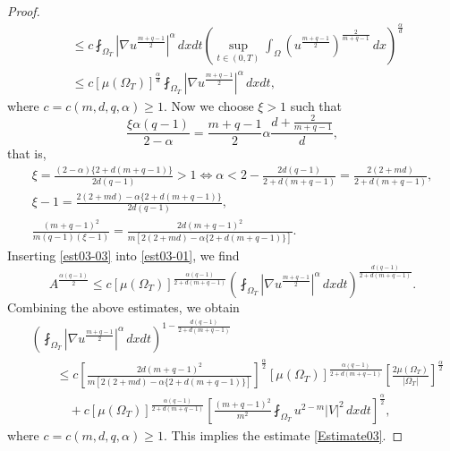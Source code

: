 \documentclass{amsart}
\numberwithin{equation}{section}
\begin{document}
\begin{proof}
\begin{equation}
\begin{aligned}
  &\le c \fint_{\Omega_T} \left|\nabla u^{\frac{m+q-1}{2}}\right|^{\alpha} \,dxdt \left(\sup_{t \in (0, T)} \int_{\Omega} \left(u^{\frac{m+q-1}{2}}\right)^{\frac{2}{m+q-1}} \,dx \right)^{\frac{\alpha}{d}}\\
  &\le c [\mu(\Omega_{T})]^{\frac{\alpha}{d}} \fint_{\Omega_T}  \left|\nabla u^{\frac{m+q-1}{2}}\right|^{\alpha} \,dxdt,
\end{aligned}
\end{equation}
where $c=c(m,d,q,\alpha)\ge 1$.
Now we choose $\xi >1$ such that
\begin{equation*}
  \frac{\xi\alpha(q-1)}{2-\alpha} = \frac{m+q-1}{2}\alpha\frac{d+\frac{2}{m+q-1}}{d},
\end{equation*}
that is,
\begin{gather*}
  \xi = \frac{(2-\alpha)\{2+d(m+q-1)\}}{2d(q-1)} > 1 \iff \alpha < 2 - \frac{2d(q-1)}{2+d(m+q-1)} = \frac{2(2+md)}{2+d(m+q-1)},\\
  \xi-1=\frac{2(2+md)-\alpha\{2+d(m+q-1)\}}{2d(q-1)},\\
  \frac{(m+q-1)^2}{m(q-1)(\xi-1)} = \frac{2d(m+q-1)^2}{m[2(2+md)-\alpha\{2+d(m+q-1)\}]}.
\end{gather*}
Inserting \eqref{est03-03} into \eqref{est03-01}, we find
\begin{equation*}
   A^{\frac{\alpha(q-1)}{2}} \le c [\mu(\Omega_{T})]^{\frac{\alpha(q-1)}{2+d(m+q-1)}} \left(
\fint_{\Omega_T}
\left|\nabla u^{\frac{m+q-1}{2}}\right|^\alpha\,dxdt
\right)^{\frac{d(q-1)}{2+d(m+q-1)}}.
\end{equation*}
Combining the above estimates, we obtain
\begin{equation*}\label{est03-04}
\begin{aligned}
&\left(\fint_{\Omega_T} \left|\nabla u^{\frac{m+q-1}{2}}\right|^{\alpha} \,dxdt\right)^{1-\frac{d(q-1)}{2+d(m+q-1)}} \\
&\qquad \le c \left[\frac{2d(m+q-1)^2}{m[2(2+md)-\alpha\{2+d(m+q-1)\}]}\right]^{\frac{\alpha}{2}} [\mu(\Omega_{T})]^{\frac{\alpha(q-1)}{2+d(m+q-1)}} \left[ \frac{2\mu(\Omega_{T})}{|\Omega_T|}\right]^{\frac{\alpha}{2}}\\
&\qquad \quad + c [\mu(\Omega_{T})]^{\frac{\alpha(q-1)}{2+d(m+q-1)}} \left[\frac{(m+q-1)^2}{m^2}\fint_{\Omega_T} u^{2-m} |V|^2 \,dxdt\right]^{\frac{\alpha}{2}},
\end{aligned}
\end{equation*}
where $c=c(m,d,q,\alpha)\ge 1$. This implies the estimate \eqref{Estimate03}.
\end{proof}
\end{document}
